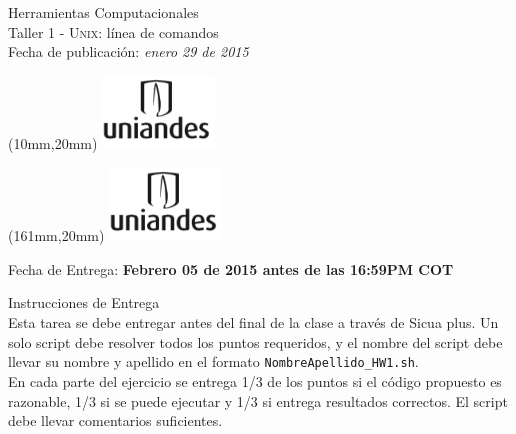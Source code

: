 \documentclass[11pt,letterpaper]{exam}
\begin{document}
\begin{center}
{\Large Herramientas Computacionales} \\
Taller 1 - \textsc{Unix}: línea de comandos \\
Fecha de publicación: {\small \it enero 29 de 2015}\\
\end{center}

\begin{textblock*}{40mm}(10mm,20mm)
  \includegraphics[width=3cm]{logoUniandes.png}
\end{textblock*}

\begin{textblock*}{40mm}(161mm,20mm)
  \includegraphics[width=3cm]{logoUniandes.png}
\end{textblock*}

\vspace{0.5cm}

{\Large Fecha de Entrega:  \bf Febrero 05 de 2015 antes de las 16:59PM COT}

\vspace{0.5cm}

{\Large Instrucciones de Entrega}\\

Esta tarea se debe entregar antes del final de la clase a través de Sicua plus. Un solo script debe resolver todos los puntos requeridos, y el nombre del script debe llevar su nombre y apellido en el formato \verb"NombreApellido_HW1.sh". \\

En cada parte del ejercicio se entrega 1/3  de los puntos si el código propuesto es razonable, 1/3 si se puede ejecutar y 1/3 si entrega resultados correctos. El script debe llevar comentarios suficientes.


\vspace{0.5cm}
\end{document}
